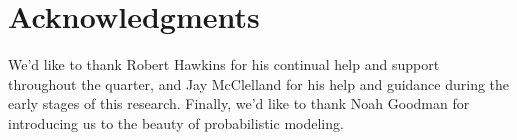 \documentclass[10pt,letterpaper]{article}
\begin{document}
\section{Acknowledgments}

We'd like to thank Robert Hawkins for his continual help and support throughout the quarter, and Jay McClelland for his help and guidance during the early stages of this research. Finally, we'd like to thank Noah Goodman for introducing us to the beauty of probabilistic modeling.






\setlength{\bibleftmargin}{.125in}
\setlength{\bibindent}{-\bibleftmargin}


\end{document}

